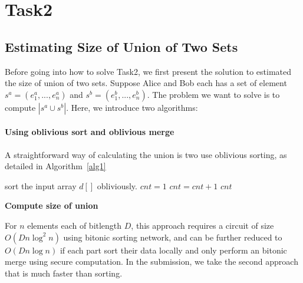 \section{Task2}
\subsection{Estimating Size of Union of Two Sets}
Before going into how to solve Task2, we first present the solution to estimated the size of union of two sets.
Suppose Alice and Bob each has a set of element $s^a = (e^a_1,...,e^a_n)$
and $s^b = (e^b_1,...,e^b_n)$. The problem we want to solve is 
to compute $|s^a\cup s^b|$. Here, we introduce two algorithms:

\paragraph{Using oblivious sort and oblivious merge}
A straightforward way of calculating the union is two use oblivious sorting, as detailed in Algorithm~\ref{alg1}

\begin{algorithm}
\begin{algorithmic}[1]
\State sort the input array $d[]$ obliviously.
\State $cnt = 1$
		\State $cnt = cnt + 1$
	\EndIf
\EndFor
\State\Return $cnt$
\end{algorithmic}
\caption{\textbf{Compute size of union}} %
\label{alg1}
\end{algorithm}
For $n$ elements each of bitlength $D$, this approach requires a circuit of size $O(Dn\log^2n)$ using bitonic sorting network,
and can be further reduced to $O(Dn\log n)$ if each part sort their data locally and only perform an bitonic merge using secure computation.
In the submission, we take the second approach that is much faster than sorting.
